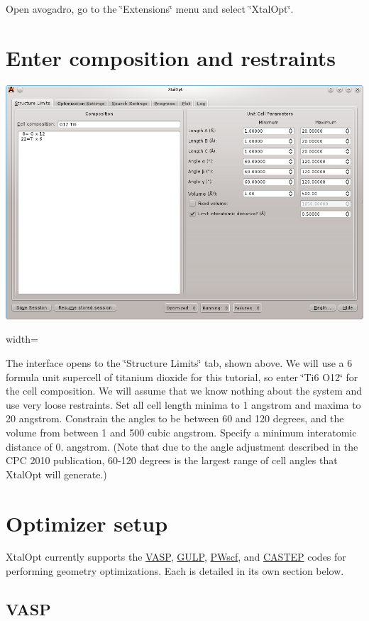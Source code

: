 Open avogadro, go to the \char`\"{}\-Extensions\char`\"{} menu and select \char`\"{}\-Xtal\-Opt\char`\"{}.\hypertarget{tut-xo_init}{}\section{Enter composition and restraints}\label{tut-xo_init}
 
\begin{DoxyImage}
\includegraphics{struct-lim.png}
\caption{width=}
\end{DoxyImage}


The interface opens to the \char`\"{}\-Structure Limits\char`\"{} tab, shown above. We will use a 6 formula unit supercell of titanium dioxide for this tutorial, so enter \char`\"{}\-Ti6 O12\char`\"{} for the cell composition. We will assume that we know nothing about the system and use very loose restraints. Set all cell length minima to 1 angstrom and maxima to 20 angstrom. Constrain the angles to be between 60 and 120 degrees, and the volume from between 1 and 500 cubic angstrom. Specify a minimum interatomic distance of 0. angstrom. (Note that due to the angle adjustment described in the C\-P\-C 2010 publication, 60-\/120 degrees is the largest range of cell angles that Xtal\-Opt will generate.)\hypertarget{tut-xo_opt}{}\section{Optimizer setup}\label{tut-xo_opt}
Xtal\-Opt currently supports the \hyperlink{tut-xo_vasp-opt}{V\-A\-S\-P}, \hyperlink{tut-xo_gulp-opt}{G\-U\-L\-P}, \hyperlink{tut-xo_pwscf-opt}{P\-Wscf}, and \hyperlink{tut-xo_castep-opt}{C\-A\-S\-T\-E\-P} codes for performing geometry optimizations. Each is detailed in its own section below.\hypertarget{tut-xo_vasp-opt}{}\subsection{V\-A\-S\-P}\label{tut-xo_vasp-opt}
 
